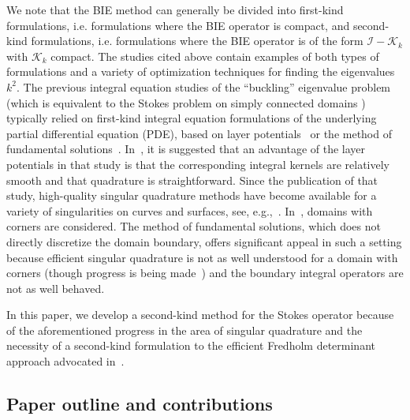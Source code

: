 {\color{red}We note that the BIE method can generally be divided
into first-kind formulations, i.e. formulations where
the BIE operator is compact, and second-kind formulations,
i.e. formulations where the BIE operator is of the form
$\mathcal{I}-\mathcal{K}_k$ with $\mathcal{K}_k$
compact. The studies cited above contain examples of both
types of formulations and a variety of optimization techniques
for finding the eigenvalues $k^2$. The previous integral equation
studies of the ``buckling'' eigenvalue problem
(which is equivalent to the Stokes problem on simply connected
domains \cite{kelliher2009eigenvalues}) typically relied on
first-kind integral equation formulations of the underlying partial
differential equation (PDE), based on layer
potentials~\cite{kitahara2014boundary}
or the method of fundamental solutions~\cite{antunes2011buckling}.
In~\cite{kitahara2014boundary}, it is suggested that an
advantage of the layer potentials in that study is that the
corresponding integral kernels are relatively smooth and that
quadrature is straightforward. Since the publication of that
study, high-quality singular quadrature methods have become
available for a variety of singularities on curves and surfaces,
see, e.g.,~\cite{kress1991boundary,alpert1999,bruno2001fast,helsing2008evaluation,bremer2010,bremer2012nystrom,qbxquadrature}. In~\cite{antunes2011buckling},
domains with corners are considered. The method of
fundamental solutions, which does not directly discretize the
domain boundary, offers significant appeal in such a setting because
efficient singular quadrature is not as well understood for a domain
with corners (though progress is being made~\cite{helsing2008corner,serkh2016solution,rachh2017solution,helsing2018integral})
and the boundary integral operators are not as well behaved.
%

In this paper, we develop a second-kind method for the Stokes
operator because
of the aforementioned progress in the area of singular
quadrature and the necessity of a second-kind formulation
to the efficient Fredholm determinant approach advocated
in~\cite{zhao2015robust}.}

\subsection{Paper outline and contributions}

